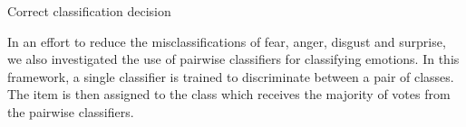 \begin{table}[tb]
\begin{minipage}{.5\linewidth}
	\end{minipage}\hfill
	\begin{minipage}{.5\linewidth}
		\centering
		Correct classification decision\\[1mm]
		
	\end{minipage} 
\end{table}
In an effort to reduce the misclassifications of fear, anger, disgust and surprise, we also investigated the use of pairwise classifiers for classifying emotions.  In this framework, a single classifier is trained to discriminate between a pair of classes. The item is then assigned to the class which receives the majority of votes from the pairwise classifiers. 

